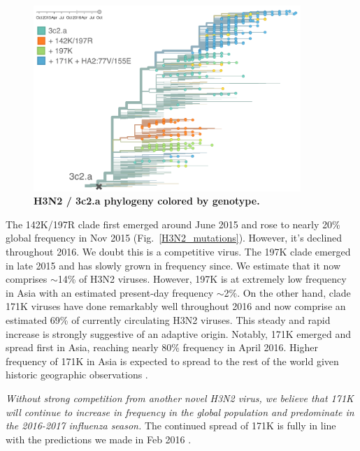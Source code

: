 \documentclass[11pt,oneside,letterpaper]{article}
\begin{document}
\begin{figure}[H]
	\centering
	\includegraphics[width=0.9\textwidth]{../figures/sep-2016/H3N2_3c2a_tree.png}
	\caption{\textbf{H3N2 / 3c2.a phylogeny colored by genotype.}
	}
	\label{H3N2_3c2a_tree}
\end{figure}

The 142K/197R clade first emerged around June 2015 and rose to nearly 20\% global frequency in Nov 2015 (Fig.\ \ref{H3N2_mutations}). However, it's declined throughout 2016. We doubt this is a competitive virus. The 197K clade emerged in late 2015 and has slowly grown in frequency since. We estimate that it now comprises $\sim$14\% of H3N2 viruses. However, 197K is at extremely low frequency in Asia with an estimated present-day frequency $\sim$2\%. On the other hand, clade 171K viruses have done remarkably well throughout 2016 and now comprise an estimated 69\% of currently circulating H3N2 viruses. This steady and rapid increase is strongly suggestive of an adaptive origin. Notably, 171K emerged and spread first in Asia, reaching nearly 80\% frequency in April 2016. Higher frequency of 171K in Asia is expected to spread to the rest of the world given historic geographic observations \cite{bedford2015global}.

\pagebreak

\textit{Without strong competition from another novel H3N2 virus, we believe that 171K will continue to increase in frequency in the global population and predominate in the 2016-2017 influenza season.} The continued spread of 171K is fully in line with the predictions we made in Feb 2016 \cite{feb2016report}.
\end{document}
